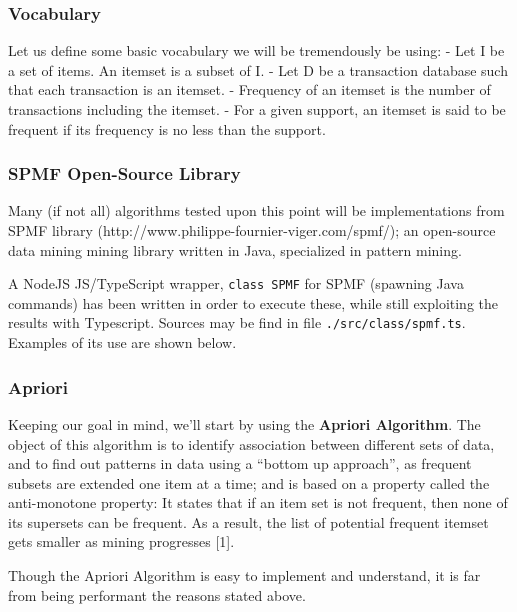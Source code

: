 \documentclass[11pt]{article}
\begin{document}
\hypertarget{vocabulary}{%
\subsubsection{Vocabulary}\label{vocabulary}}

Let us define some basic vocabulary we will be tremendously be using: -
Let I be a set of items. An itemset is a subset of I. - Let D be a
transaction database such that each transaction is an itemset. -
Frequency of an itemset is the number of transactions including the
itemset. - For a given support, an itemset is said to be frequent if its
frequency is no less than the support.

\hypertarget{spmf-open-source-library}{%
\subsubsection{SPMF Open-Source
Library}\label{spmf-open-source-library}}

Many (if not all) algorithms tested upon this point will be
implementations from SPMF library
(http://www.philippe-fournier-viger.com/spmf/); an open-source data
mining mining library written in Java, specialized in pattern mining.

A NodeJS JS/TypeScript wrapper, \texttt{class\ SPMF} for SPMF (spawning
Java commands) has been written in order to execute these, while still
exploiting the results with Typescript. Sources may be find in file
\texttt{./src/class/spmf.ts}. Examples of its use are shown below.

\hypertarget{apriori}{%
\subsubsection{Apriori}\label{apriori}}

Keeping our goal in mind, we'll start by using the \textbf{Apriori
Algorithm}. The object of this algorithm is to identify association
between different sets of data, and to find out patterns in data using a
``bottom up approach'', as frequent subsets are extended one item at a
time; and is based on a property called the anti-monotone property: It
states that if an item set is not frequent, then none of its supersets
can be frequent. As a result, the list of potential frequent itemset
gets smaller as mining progresses {[}1{]}.

Though the Apriori Algorithm is easy to implement and understand, it is
far from being performant the reasons stated above.
\end{document}
